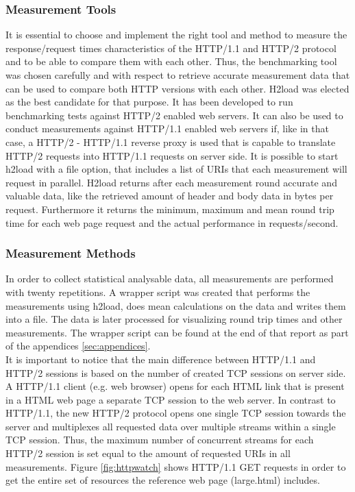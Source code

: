 \subsubsection{Measurement Tools}
It is essential to choose and implement the right tool and method to measure the response/request times characteristics of the HTTP/1.1 and HTTP/2 protocol and to be able to compare them with each other. Thus, the benchmarking tool was chosen carefully and with respect to retrieve accurate measurement data that can be used to compare both HTTP versions with each other. 
H2load \cite{h2load} was elected as the best candidate for that purpose. It has been developed to run benchmarking tests against HTTP/2 enabled web servers. 
It can also be used to conduct measurements against HTTP/1.1 enabled web servers if, like in that case, a HTTP/2 - HTTP/1.1 reverse proxy is used that is capable to translate HTTP/2 requests into HTTP/1.1 requests on server side. 
It is possible to start h2load with a file option, that includes a list of URIs that each measurement will request in parallel. H2load returns after each measurement round accurate and valuable data, like the retrieved  amount of header and body data in bytes per request. Furthermore it returns the minimum, maximum and mean round trip time for each web page request and the actual performance in requests/second. 
\\
\subsubsection{Measurement Methods}
In order to collect statistical analysable data, all measurements are performed with twenty repetitions. A wrapper script was created that performs the measurements using h2load, does mean calculations on the data and writes them into a file. The data is later processed for visualizing round trip times and other measurements. The wrapper script can be found at the end of that report as part of the appendices \ref{sec:appendices}. 
\\
It is important to notice that the main difference between HTTP/1.1 and HTTP/2 sessions is based on the number of created TCP sessions on server side. A HTTP/1.1 client (e.g. web browser) opens for each HTML link that is present in a HTML web page a separate TCP session to the web server. In contrast to HTTP/1.1, the new HTTP/2 protocol opens one single TCP session towards the server and multiplexes all requested data over multiple streams within a single TCP session. Thus, the maximum number of concurrent streams for each HTTP/2 session is set equal to the amount of requested URIs in all measurements. Figure \ref{fig:httpwatch} shows HTTP/1.1 GET requests in order to get the entire set of resources the reference web page (large.html) includes.



